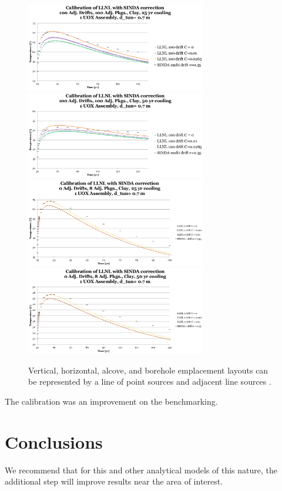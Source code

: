 \documentclass{anstrans}
\begin{document}
\begin{figure}[h!]
  \centering
    \includegraphics[width=0.7\textwidth]{100drift25yr.eps}
    \includegraphics[width=0.7\textwidth]{100drift50yr.eps}
    \includegraphics[width=0.7\textwidth]{1drift25yr.eps}
    \includegraphics[width=0.7\textwidth]{1drift50yr.eps}
  \caption{Vertical, horizontal, alcove, and borehole emplacement layouts can be 
  represented by a line of point sources and adjacent line sources 
  \cite{sutton_investigations_2011}.}
  \label{fig:llnl}
\end{figure}



The calibration was an improvement on the benchmarking.

\section{Conclusions}

We recommend that for this and other analytical models of this nature, the 
additional step will improve results near the area of interest.



\end{document}
